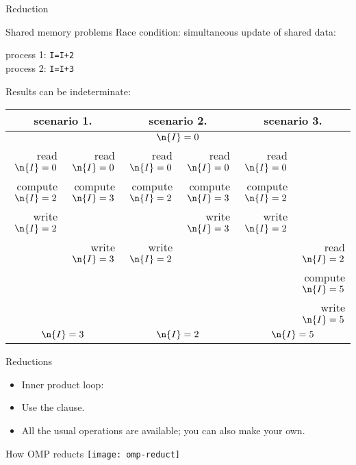  {Reduction}

\begin{exerciseframe}
  
\end{exerciseframe}

\begin{numberedframe}{Shared memory problems}
Race condition: simultaneous update of shared data:
\begin{tabbing}
  process 1: \texttt{I=I+2}\\
  process 2: \texttt{I=I+3}
\end{tabbing}
Results can be indeterminate:

\tiny
\begin{tabular}{|rr|rr|rr|}
  \hline
  \multicolumn{2}{|c|}{scenario 1.}& \multicolumn{2}{|c|}{scenario 2.}&
  \multicolumn{2}{|c|}{scenario 3.}\\ \hline
  \multicolumn{6}{|c|}{$\n{I}=0$}\\ \hline
  read $\n{I}=0$&read $\n{I}=0$&
    read $\n{I}=0$&read $\n{I}=0$&
      read $\n{I}=0$& \\
  compute $\n{I}=2$&compute $\n{I}=3$& 
    compute $\n{I}=2$&compute $\n{I}=3$&
      compute $\n{I}=2$& \\
  write $\n{I}=2$& & &write $\n{I}=3$&write $\n{I}=2$& \\
  &write $\n{I}=3$&write $\n{I}=2$& & &read $\n{I}=2$\\
  &&&&&compute $\n{I}=5$\\
  &&&&&write $\n{I}=5$\\
  \hline
  \multicolumn{2}{|c|}{$\n{I}=3$}& \multicolumn{2}{|c|}{$\n{I}=2$}&
  \multicolumn{2}{|c|}{$\n{I}=5$}\\ \hline
\end{tabular}
\end{numberedframe}

\begin{numberedframe}{Reductions}
  \begin{itemize}
  \item Inner product loop:
  \item Use the  clause.
  \item All the usual operations are available; you can also make your own.
  \end{itemize}
\end{numberedframe}

\begin{numberedframe}{How OMP reducts}
  \texttt{[image: omp-reduct]}  
\end{numberedframe}

